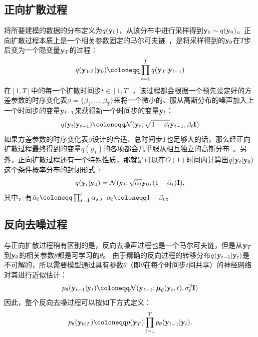 \subsection{正向扩散过程}
将所要建模的数据的分布定义为$q(\mathbf{y}_0)$，从该分布中进行采样得到$\mathbf{y}_0\sim q(\mathbf{y}_0)$。正向扩散过程本质上是一个相关参数固定的马尔可夫链~\citep{Ho2020ddpm}，是将采样得到的$\mathbf{y}_0$在$T$步后变为一个隐变量$\mathbf{y}_T$的过程：
\begin{equation}
  q(\by_{1:T} | \by_0) \defeq \prod_{t=1}^T q(\by_T | \by_{t-1} )
\end{equation}
在$[1, T]$中的每一个扩散时间步$t \in [1, T]$，该过程都会根据一个预先设定好的方差参数的时序变化表$\beta = \{\beta_1, \dotsc, \beta_T\}$来将一个微小的、服从高斯分布的噪声加入上一个时间步的变量$\mathbf{y}_{t-1}$来获得新一个时间步的变量$\mathbf{y}_t$：
\begin{equation}
  q(\by_t|\by_{t-1}) \defeq \mathcal{N}(\by_t;\sqrt{1-\beta_t}\by_{t-1},\beta_t \bI)
\end{equation}
如果方差参数的时序变化表$\beta$设计的合适、总时间步$T$也足够大的话，那么经正向扩散过程最终得到的变量$q(y_T)$的各项都会几乎服从相互独立的高斯分布~\citep{Ho2020ddpm,nichol2021improved}。另外，正向扩散过程还有一个特殊性质，那就是可以在$O(1)$时间内计算出$q(\mathbf{y}_t|\mathbf{y}_0)$这个条件概率分布的封闭形式~\citep{Ho2020ddpm}:
\begin{align}
	q(\mathbf{y}_t|\mathbf{y}_0) = \mathcal{N}(\mathbf{y}_t; \sqrt{\bar\alpha_t}\mathbf{y}_0, (1-\bar\alpha_t)\mathbf{I}), \label{eq:one_step_noise}
\end{align}
其中，有$\bar\alpha_t \defeq \prod_{s=1}^t \alpha_s$，$\alpha_t \defeq 1-\beta_t$。
\subsection{反向去噪过程}
与正向扩散过程稍有区别的是，反向去噪声过程也是一个马尔可夫链，但是从$\mathbf{y}_T$到$\mathbf{y}_0$的相关参数$\theta$都是可学习的$\theta$。
由于精确的反向过程的转移分布$q(\mathbf{y}_{t-1}|\mathbf{y}_t)$是不可解的，所以需要模型通过具有参数$\theta$（即$\theta$在每个时间步$t$间共享）的神经网络对其进行近似估计：
\begin{equation}
  \label{eq:reverse_step}
  p_\theta(\by_{t-1}|\by_t) \defeq \mathcal{N}(\by_{t-1}; \bmu_\theta(\by_t, t), \sigma_t^2\bI)
\end{equation}
因此，整个反向去噪过程可以按如下方式定义：
\begin{equation}
p_\theta(\by_{0:T}) \defeq p(\by_T)\prod_{t=1}^T p_\theta(\by_{t-1}|\by_t).
\end{equation}
